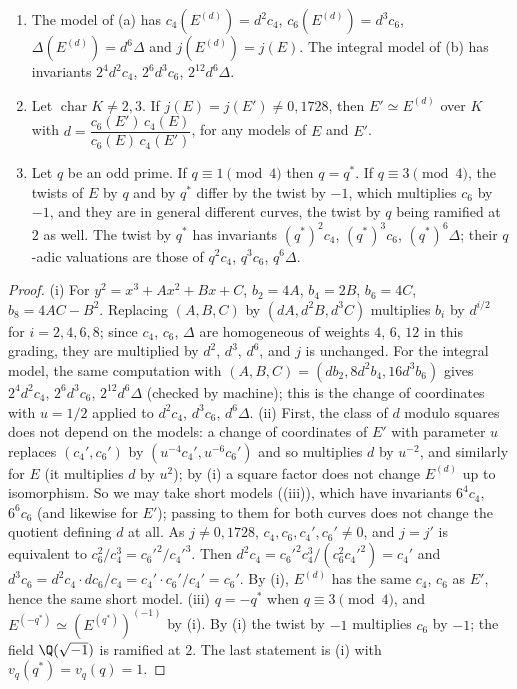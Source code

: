 \begin{proposition}\label{prop:ellcurves:twistinv}
\leavevmode
\begin{enumerate}[label=(\roman*)]
\item The model of (a) has $c_4(E^{(d)})=d^2c_4$, $c_6(E^{(d)})=d^3c_6$, $\Delta(E^{(d)})=d^6\Delta$ and $j(E^{(d)})=j(E)$. The integral model of
(b) has invariants $2^4d^2c_4$, $2^6d^3c_6$, $2^{12}d^6\Delta$.
\item Let $\operatorname{char}K\ne2,3$. If $j(E)=j(E')\ne0,1728$, then $E'\simeq E^{(d)}$ over $K$ with $d=\dfrac{c_6(E')\,c_4(E)}{c_6(E)\,c_4(E')}$, for any models of $E$ and $E'$.
\item Let $q$ be an odd prime. If $q\equiv1\pmod4$ then $q=q^*$. If $q\equiv3\pmod4$, the twists of $E$ by $q$ and by $q^*$ differ by the twist by $-1$, which multiplies $c_6$ by $-1$, and they
are in general different curves, the twist by $q$ being ramified at $2$ as well. The twist by $q^*$ has invariants $(q^*)^2c_4$, $(q^*)^3c_6$, $(q^*)^6\Delta$; their $q$-adic valuations are those of $q^2c_4$, $q^3c_6$, $q^6\Delta$.
\end{enumerate}
\end{proposition}

\begin{proof}
(i) For $y^2=x^3+Ax^2+Bx+C$, $b_2=4A$, $b_4=2B$, $b_6=4C$, $b_8=4AC-B^2$. Replacing $(A,B,C)$ by $(dA,d^2B,d^3C)$ multiplies $b_i$ by $d^{i/2}$ for $i=2,4,6,8$; since $c_4$, $c_6$, $\Delta$
are homogeneous of weights $4$, $6$, $12$ in this grading, they are multiplied by $d^2$, $d^3$, $d^6$, and $j$ is unchanged. For the integral model, the same computation with
$(A,B,C)=(db_2,8d^2b_4,16d^3b_6)$ gives $2^4d^2c_4$, $2^6d^3c_6$, $2^{12}d^6\Delta$ (checked by machine); this is the change of coordinates with $u=1/2$ applied to $d^2c_4$, $d^3c_6$, $d^6\Delta$.
(ii) First, the class of $d$ modulo squares does not depend on the models: a change of coordinates of $E'$ with parameter $u$ replaces $(c_4',c_6')$ by
$(u^{-4}c_4',u^{-6}c_6')$ and so multiplies $d$ by $u^{-2}$, and similarly for $E$ (it multiplies $d$ by $u^2$); by (i) a square factor does not
change $E^{(d)}$ up to isomorphism. So we may take short models ((iii)), which have invariants $6^4c_4$, $6^6c_6$ (and likewise for $E'$); passing to them
for both curves does not change the quotient defining $d$ at all. As $j\ne0,1728$, $c_4,c_6,c_4',c_6'\ne0$, and $j=j'$ is equivalent to $c_6^2/c_4^3=c_6'^2/c_4'^3$. Then $d^2c_4=c_6'^2c_4^3/(c_6^2c_4'^2)=c_4'$ and
$d^3c_6=d^2c_4\cdot dc_6/c_4=c_4'\cdot c_6'/c_4'=c_6'$. By (i), $E^{(d)}$ has the same $c_4$, $c_6$ as $E'$, hence the same short model. (iii) $q=-q^*$ when $q\equiv3\pmod4$, and $E^{(-q^*)}\simeq(E^{(q^*)})^{(-1)}$
by (i). By (i) the twist by $-1$ multiplies $c_6$ by $-1$; the field $\Q(\sqrt{-1})$ is ramified at $2$. The last statement is (i) with $v_q(q^*)=v_q(q)=1$.
\end{proof}

